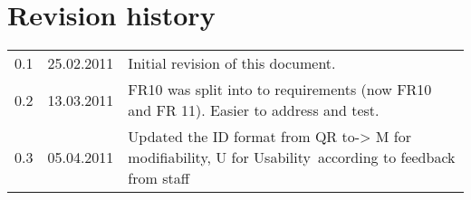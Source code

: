 \documentclass[titlepage,a4paper,11pt]{article}
\begin{document}
\printbibliography


\section{Revision history}

\begin{table}[H]
  \begin{tabular}{| c | c | p{5cm} |}
    \hline
    0.1 & 25.02.2011 & Initial revision of this document. \\
	0.2 & 13.03.2011 & FR10 was split into to requirements (now FR10 and FR 11). Easier to address and test. \\
	0.3 & 05.04.2011 & Updated the ID format from QR to-> M for modifiability, U for Usability according to feedback from staff\\
    \hline
  \end{tabular}
\end{table}
\end{document}
